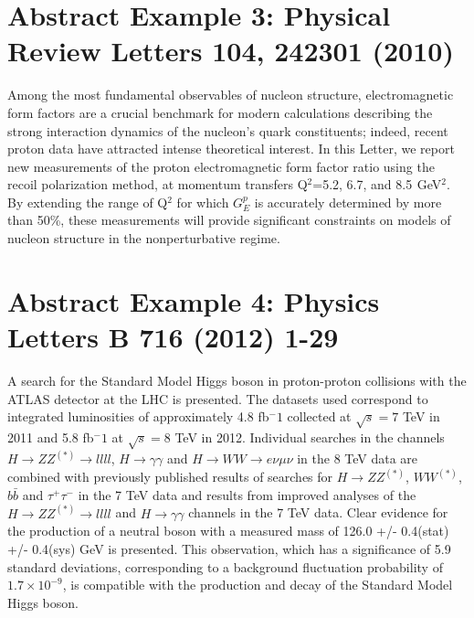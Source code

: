 \documentclass{article}
\begin{document}
\section{Abstract Example 3: Physical Review Letters 104, 242301 (2010)}
Among the most fundamental observables of nucleon structure, electromagnetic form factors are a crucial benchmark for modern calculations describing the strong interaction dynamics of the nucleon's quark constituents; indeed, recent proton data have attracted intense theoretical interest. In this Letter, we report new measurements of the proton electromagnetic form factor ratio using the recoil polarization method, at momentum transfers Q$^2$=5.2, 6.7, and 8.5  GeV$^2$. By extending the range of Q$^2$ for which $G_E^p$ is accurately determined by more than 50\%, these measurements will provide significant constraints on models of nucleon structure in the nonperturbative regime.


\section{Abstract Example 4: Physics Letters B 716 (2012) 1-29}
A search for the Standard Model Higgs boson in proton-proton collisions with the ATLAS detector at the LHC is presented. The datasets used correspond to integrated luminosities of approximately 4.8 fb$^-1$ collected at $\sqrt{s} = 7$ TeV in 2011 and 5.8 fb$^-1$ at $\sqrt{s} = 8$ TeV in 2012. Individual searches in the channels $H \rightarrow ZZ^{(*)}\rightarrow llll$, $H\rightarrow\gamma \gamma$ and $H\rightarrow WW \rightarrow e \nu \mu \nu$ in the 8 TeV data are combined with previously published results of searches for $H\rightarrow ZZ^{(*)}$, $WW^{(*)}$, $b\bar{b}$ and $\tau^+\tau^-$ in the 7 TeV data and results from improved analyses of the $H\rightarrow ZZ^{(*)}\rightarrow llll$ and $H\rightarrow \gamma \gamma$ channels in the 7 TeV data. Clear evidence for the production of a neutral boson with a measured mass of 126.0 +/- 0.4(stat) +/- 0.4(sys) GeV is presented. This observation, which has a significance of 5.9 standard deviations, corresponding to a background fluctuation probability of $1.7\times 10^{-9}$, is compatible with the production and decay of the Standard Model Higgs boson.
\end{document}
